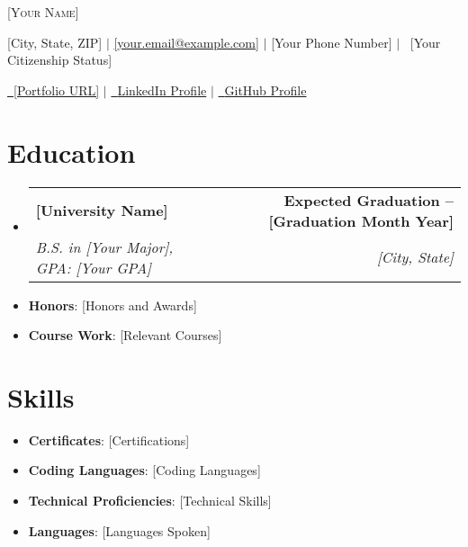 \documentclass[11pt, letterpaper]{article} %
\makeatletter
\newcommand{\resumeSubheading}[4]{
  \vspace{0pt}\item %
    \begin{tabular*}{0.98\textwidth}[t]{l@{\extracolsep{\fill}}r}
      \textbf{#1} & \textbf{#2} \\ %
      \textit{\small #3} & \textit{\small #4} \\ %
    \end{tabular*}\vspace{-6pt}
}
\newcommand{\resumeListStart}{
  \begin{itemize}[leftmargin=0.1in, label={}] %
}
\newcommand{\resumeListEnd}{
  \end{itemize} \vspace{-6pt} %
}
\newcommand{\resumeItem}[1]{
  \item\small{#1 \vspace{-6pt}} %
}
\makeatother
\begin{document}
\begin{center}
    {\Huge \scshape [Your Name]} \vspace{5pt} %

    \faMapMarker \hspace{1pt} [City, State, ZIP] $|$ \hspace{1pt} 
    \faEnvelope \hspace{1pt} \href{mailto:[your.email@example.com]}{[your.email@example.com]} $|$ \hspace{1pt} 
    \faPhone \hspace{1pt} [Your Phone Number] $|$ \hspace{1pt} 
    \faPassport\ [Your Citizenship Status]
    
    \vspace{1pt}

    \href{[PORTFOLIO HYPERLINK]}{\faBriefcase\ [Portfolio URL]} $|$ \hspace{1pt}
    \href{[LinkedIn URL]}{\faLinkedin\ {LinkedIn Profile}} $|$ \hspace{1pt}
    \href{[GitHub URL]}{\faGithub\ {GitHub Profile}} 
\end{center}

\section{Education}
    \resumeListStart
        \resumeSubheading{[University Name]}{Expected Graduation -- [Graduation Month Year]}{B.S. in [Your Major], GPA: [Your GPA]}{[City, State]}
        \resumeItem{\textbf{Honors}{: [Honors and Awards]}}
        \resumeItem{\textbf{Course Work}{: [Relevant Courses]}}
    \resumeListEnd

\section{Skills}
\resumeListStart
    \resumeItem{\textbf{Certificates}{: [Certifications]}}
    \resumeItem{\textbf{Coding Languages}{: [Coding Languages]}}
    \resumeItem{\textbf{Technical Proficiencies}{: [Technical Skills]}}
    \resumeItem{\textbf{Languages}{: [Languages Spoken]}}
\resumeListEnd
\end{document}
